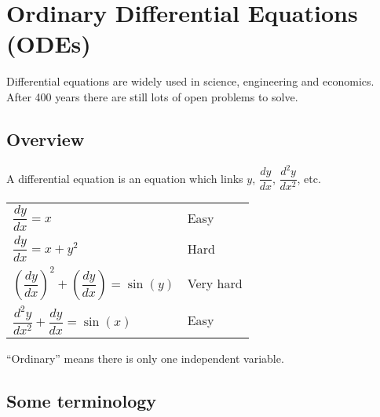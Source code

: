 \section{Ordinary Differential Equations (ODEs)}


Differential equations are widely used in science, engineering and economics.  After 400 years there are still lots of open problems to solve.

\subsection{Overview}

A differential equation is an equation which links $y$,\quad
$\dfrac{dy}{dx}$, \quad $\dfrac{d^2 y}{dx^2}$, etc.

\begin{examples}\quad
\begin{tabular}{ll}
$\dfrac{dy}{dx}  =  x$ & Easy \\
$\dfrac{dy}{dx}  =  x + y^2$ & Hard \\
$\left(\dfrac{dy}{dx}\right)^2 + \left(\dfrac{dy}{dx}\right)  =  \sin(y)$ & Very hard \\
$\dfrac{d^2y}{dx^2} + \dfrac{dy}{dx}  =  \sin(x)$ & Easy
\end{tabular}
\end{examples}

``Ordinary'' means there is only one independent variable.

\subsection*{Some terminology}

